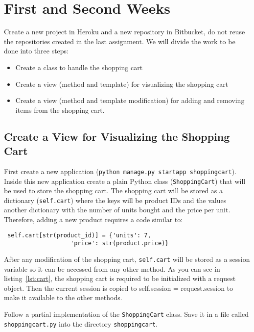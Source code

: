 \documentclass[12pt]{article} %
\newcommand{\ttt}[1]{\texttt{#1}}%
\begin{document}
\section{First and Second Weeks}

Create a new project  in Heroku and a new repository in Bitbucket, do not reuse the repositories created in the last assignment. We will divide the work to be done into three steps:

\begin{itemize}
 \item Create a class to handle the shopping cart
 \item Create a view (method and template) for visualizing the shopping cart
 \item Create a view (method and template modification) for adding and removing items from the shopping cart.
\end{itemize}


\subsection{Create a View for Visualizing the Shopping Cart}
First create a new application (\ttt{python manage.py startapp shoppingcart}). Inside this new application create a plain Python class (\ttt{ShoppingCart}) that will be used to store the shopping cart. The shopping cart will be stored as a dictionary (\ttt{self.cart}) where the keys will be product IDs and the values another dictionary with the number of units bought and the price per unit. Therefore, adding a new product requires a code similar to:

\begin{lstlisting}
 self.cart[str(product_id)] = {'units': 7,
			       'price': str(product.price)}
\end{lstlisting}
After any modification of the shopping cart, \ttt{self.cart}  will be stored as a session variable so it can be accessed from any other method. As you can see in listing~\ref{lst:cart}, the shopping cart is required to be initialized with a request object. Then the current session is copied to self.session = request.session to make it available to the other methods. 

Follow a partial implementation of the \ttt{ShoppingCart} class. Save it in a file called  \ttt{shoppingcart.py} into the directory \ttt{shoppingcart}.
\end{document}
